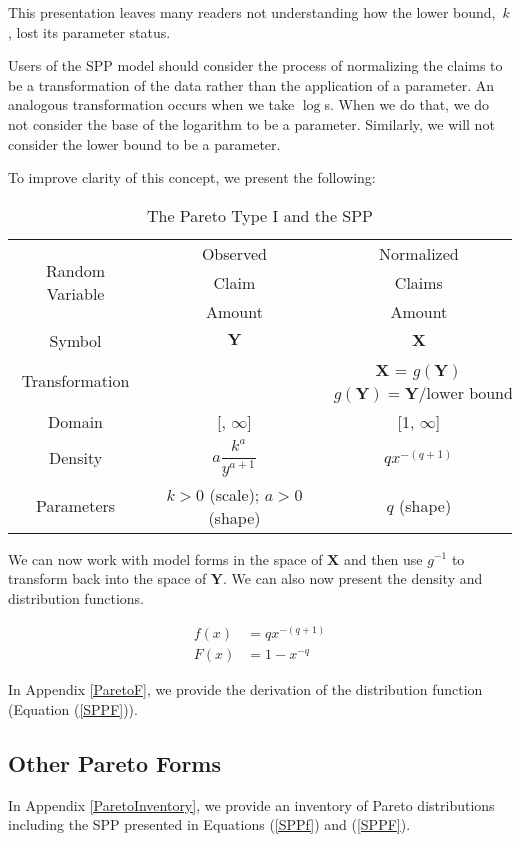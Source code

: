 \documentclass[]{article} %
\begin{document}
This presentation leaves many readers not understanding how the lower bound,~$k$,  lost its parameter status. 

Users of the SPP model should consider the process of normalizing the claims to be a transformation of the data rather than the application of a parameter. An analogous transformation occurs when we take $\log$s. When we do that, we do not consider the base of the logarithm to be a parameter. Similarly, we will not consider the lower bound to be a parameter.

To improve clarity of this concept, we present the following:

\begin{table}[h!]
	\centering
	\begin{tabular}[h]{ccc}
		\toprule
		\multirow{3}{*}{Random Variable}& Observed & Normalized\\
		& Claim & Claims\\
		& Amount & Amount \\ \midrule
		Symbol & $\mathbf{Y}$ & $\mathbf{X}$\\ \midrule
		\multirow{2}{*}{Transformation} & & $\mathbf{X}$  =  $g(\mathbf{Y})$\\
		& & $g(\mathbf{Y}) =   \mathbf{Y}/\text{lower bound}$  \\ \midrule
		Domain & [\text{lower bound}, $\infty$] & [1, $\infty$]\\ \midrule
		Density & $a \dfrac{k^a}{y^{a+1}}$ & $qx^{-(q+1)}$\\ \midrule
		Parameters & $k>0$ (scale); $a>0$ (shape)& $q$ (shape)\\ 
	\bottomrule
	\end{tabular}
	\caption{The Pareto Type I and the SPP}\label{tbl:PIvSpp}			
\end{table}
We can now work with model forms in the space of $\mathbf{X}$ and then use $g^{-1}$ to transform back into the space of $\mathbf{Y}$. We can also now present the density and distribution functions.

\begin{align}
		f(x) & =  qx^{-(q+1)}\label{SPPf}\\
		F(x) & =  1 - x^{-q}\label{SPPF}
\end{align}

In  Appendix \ref{ParetoF}, we provide the derivation of the distribution function (Equation (\ref{SPPF})).

\subsection{Other Pareto Forms}
In Appendix \ref{ParetoInventory}, we provide an inventory of Pareto distributions including the SPP presented in Equations (\ref{SPPf}) and (\ref{SPPF}). 
\end{document}
